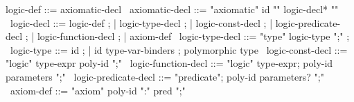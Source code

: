 \begin{syntax}
  logic-def ::= axiomatic-decl
  \
  axiomatic-decl ::= "axiomatic" id "{" logic-decl* "}"
  \
  logic-decl ::= logic-def ;
  | logic-type-decl ;
  | logic-const-decl ;
  | logic-predicate-decl ;
  | logic-function-decl ;
  | axiom-def
  \
  logic-type-decl ::= "type" logic-type ";" ;
  \
  logic-type ::= id ;
  | id type-var-binders ; polymorphic type
  \
  logic-const-decl ::=  "logic" type-expr poly-id ";"
  \
  logic-function-decl ::=
  "logic" type-expr;
  poly-id parameters ";"
  \
  logic-predicate-decl ::=
  "predicate";
  poly-id parameters? ";"
  \
  axiom-def ::= "axiom" poly-id ":" pred ";" 
\end{syntax}
